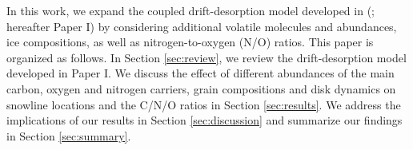 \documentclass[apj]{emulateapj}
\newcommand{\emgr}[1]{\emph{ \color{gray} #1}}
\begin{document}
 


In this work, we expand the coupled drift-desorption model developed in (\citealt{piso15b}; hereafter Paper I) by considering additional volatile molecules and abundances, ice compositions, as well as nitrogen-to-oxygen (N/O) ratios. This paper is organized as follows. In Section \ref{sec:review}, we review the drift-desorption model developed in Paper I. We discuss the effect of different abundances of the main carbon, oxygen and nitrogen carriers, grain compositions and disk dynamics on snowline locations and the C/N/O ratios in Section \ref{sec:results}. We address the implications of our results in Section \ref{sec:discussion} and summarize our findings in Section \ref{sec:summary}.  


\end{document}
